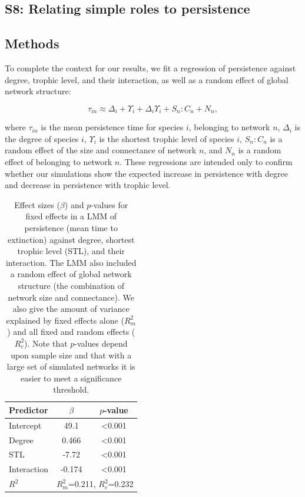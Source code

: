 \documentclass[12pt]{article}
\begin{document}
\begin{spacing}{2.0}
\clearpage


\section*{S8: Relating simple roles to persistence}

	\subsection*{Methods}

            To complete the context for our results, we fit a regression of persistence against degree, trophic level, and their interaction, as well as a random effect of global network structure:
            
            \begin{equation}
                \tau_{in} \approx \Delta_{i} + \Upsilon_{i} + \Delta_{i}\Upsilon_{i} + S_{n}:C_{n} + N_n ,
                \label{eq:persistence_degTL}
            \end{equation}
            
            \noindent where $\tau_{in}$ is the mean persistence time for species $i$, belonging to network $n$, $\Delta_i$ is the degree of species $i$, $\Upsilon_i$ is the shortest trophic level of species $i$, $S_{n}:C_{n}$ is a random effect of the size and connectance of network $n$, and $N_n$ is a random effect of belonging to network $n$.
            These regressions are intended only to confirm whether our simulations show the expected increase in persistence with degree and decrease in persistence with trophic level.


		\begin{table}[hb!]
			\caption{Effect sizes ($\beta$) and $p$-values for fixed effects in a LMM of persistence (mean time to extinction) against degree, shortest trophic level (STL), and their interaction. The LMM also included a random effect of global network structure (the combination of network size and connectance). We also give the amount of variance explained by fixed effects alone ($R^2_m$) and all fixed and random effects ($R^2_c$). Note that $p$-values depend upon sample size and that with a large set of simulated networks it is easier to meet a significance threshold.}
			\label{tab:per_degTL}
			\begin{tabular}{l | c c }
			Predictor & $\beta$ & $p$-value \\
			\hline
			Intercept & 49.1 & \textless0.001 \\
			Degree & 0.466 & \textless0.001 \\
			STL & -7.72 & \textless0.001 \\
			Interaction & -0.174 & \textless0.001 \\
			\hline
			$R^2$ & \multicolumn{2}{|c}{$R^2_m$=0.211, $R^2_c$=0.232} \\
			\end{tabular}
			\end{table}


\end{spacing}
\end{document}
